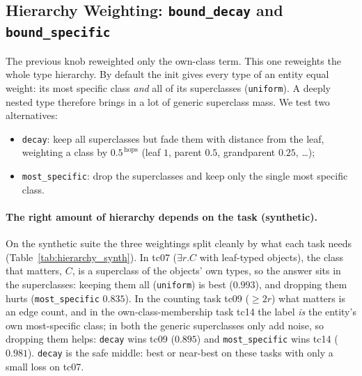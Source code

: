 \documentclass[a4paper,oneside,bibliography=totoc]{scrbook}
\begin{document}
\subsection{Hierarchy Weighting: \texttt{bound\_decay} and \texttt{bound\_specific}}
\label{sec:dbpedia_hierarchy}

The previous knob reweighted only the own-class term. This one reweights the
whole type hierarchy. By default the init gives every type of an entity equal
weight: its most specific class \emph{and} all of its superclasses
(\texttt{uniform}). A deeply nested type therefore brings in a lot of generic
superclass mass. We test two alternatives:
\begin{itemize}
  \item \texttt{decay}: keep all superclasses but fade them with distance from
  the leaf, weighting a class by $0.5^{\,\mathrm{hops}}$ (leaf $1$, parent $0.5$,
  grandparent $0.25$, \dots);
  \item \texttt{most\_specific}: drop the superclasses and keep only the single
  most specific class.
\end{itemize}

\paragraph{The right amount of hierarchy depends on the task (synthetic).}
On the synthetic suite the three weightings split cleanly by what each task needs
(Table~\ref{tab:hierarchy_synth}). In tc07 ($\exists r.C$ with leaf-typed
objects), the class that matters, $C$, is a superclass of the objects' own types,
so the answer sits in the superclasses: keeping them all (\texttt{uniform}) is
best ($0.993$), and dropping them hurts (\texttt{most\_specific} $0.835$). In the
counting task tc09 ($\geq 2r$) what matters is an edge count, and in the
own-class-membership task tc14 the label \emph{is} the entity's own most-specific
class; in both the generic superclasses only add noise, so dropping them helps:
\texttt{decay} wins tc09 ($0.895$) and \texttt{most\_specific} wins tc14
($0.981$). \texttt{decay} is the
safe middle: best or near-best on these tasks with only a small loss on
tc07.
\end{document}
